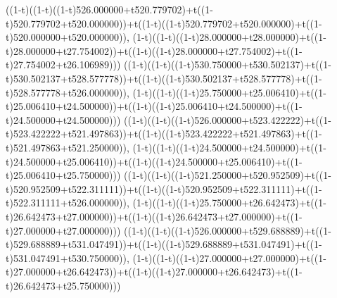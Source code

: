 ((1-t)((1-t)((1-t)526.000000+t520.779702)+t((1-t)520.779702+t520.000000))+t((1-t)((1-t)520.779702+t520.000000)+t((1-t)520.000000+t520.000000)),                                     (1-t)((1-t)((1-t)28.000000+t28.000000)+t((1-t)28.000000+t27.754002))+t((1-t)((1-t)28.000000+t27.754002)+t((1-t)27.754002+t26.106989)))
((1-t)((1-t)((1-t)530.750000+t530.502137)+t((1-t)530.502137+t528.577778))+t((1-t)((1-t)530.502137+t528.577778)+t((1-t)528.577778+t526.000000)),                                     (1-t)((1-t)((1-t)25.750000+t25.006410)+t((1-t)25.006410+t24.500000))+t((1-t)((1-t)25.006410+t24.500000)+t((1-t)24.500000+t24.500000)))
((1-t)((1-t)((1-t)526.000000+t523.422222)+t((1-t)523.422222+t521.497863))+t((1-t)((1-t)523.422222+t521.497863)+t((1-t)521.497863+t521.250000)),                                     (1-t)((1-t)((1-t)24.500000+t24.500000)+t((1-t)24.500000+t25.006410))+t((1-t)((1-t)24.500000+t25.006410)+t((1-t)25.006410+t25.750000)))
((1-t)((1-t)((1-t)521.250000+t520.952509)+t((1-t)520.952509+t522.311111))+t((1-t)((1-t)520.952509+t522.311111)+t((1-t)522.311111+t526.000000)),                                     (1-t)((1-t)((1-t)25.750000+t26.642473)+t((1-t)26.642473+t27.000000))+t((1-t)((1-t)26.642473+t27.000000)+t((1-t)27.000000+t27.000000)))
((1-t)((1-t)((1-t)526.000000+t529.688889)+t((1-t)529.688889+t531.047491))+t((1-t)((1-t)529.688889+t531.047491)+t((1-t)531.047491+t530.750000)),                                     (1-t)((1-t)((1-t)27.000000+t27.000000)+t((1-t)27.000000+t26.642473))+t((1-t)((1-t)27.000000+t26.642473)+t((1-t)26.642473+t25.750000)))
